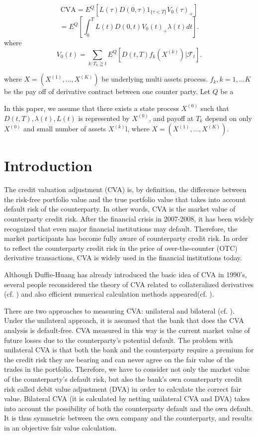 \documentclass[12pt]{article}
\begin{document}
$$\text{CVA}= E^Q[L(\tau)D(0,\tau)1_{\{\tau <T\}}V_0(\tau)_{+}]$$ $$=E^{Q}[\int_0^T L(t)D(0,t) V_0(t)_{+} \lambda(t) dt ]  .$$
where $$V_0(t) = \sum_{k:T_k\geqq t} E^{Q}[D(t,T) f_k(X^{(k)}) |\mathcal{F}_t].$$
 

 where $X=(X^{(1)}, \ldots, X^{(K)})$ be underlying multi assets process. $f_k, k=1,\ldots K$ be the pay off of derivative contract between one counter party. Let $Q$ be a 

 In this paper, we assume that there exists a state process $X^{(0)}$ such that $D(t,T), \lambda(t),
L(t)$ is represented by $X^{(0)}$, and payoff at $T_k$ depend on only $X^{(0)}$ and small number of 
assets $X^{(k)}$l, where $X=(X^{(1)}, \ldots, X^{(K)})$.

\section{Introduction}
The credit valuation adjustment (CVA) is, by definition, the difference
between the risk-free portfolio value and the true portfolio value that takes into account
default risk of the counterparty. In other words, CVA is the market value of counterparty credit risk.
After the financial crisis in 2007-2008, it has been widely recognized that even major financial institutions may default.
Therefore, the market participants has become fully aware of counterparty credit risk.
In order to reflect the counterparty credit risk in the price of over-the-counter (OTC) derivative transactions,
CVA is widely used in the financial institutions today.

Although Duffie-Huang \cite{DU} has already introduced the basic idea of CVA  in 1990's, 
several people reconsidered the theory of CVA related to collateralized derivatives (cf. \cite{FT}) and 
also efficient numerical calculation methods appeared(cf. \cite{H}).

There are two approaches to measuring CVA: unilateral and bilateral (cf. \cite{Gre}). 
Under the unilateral approach, it is assumed that the bank that does
the CVA analysis is default-free.
CVA measured in this way is the current market value of future losses due to the counterparty's potential
default. The problem with unilateral CVA is that both the bank and the counterparty require a
premium for the credit risk they are bearing and can never agree on the fair value of the trades in
the portfolio. Therefore, we have to consider not only the market value of the counterparty's default risk, but also the bank's own counterparty credit risk
called debit value adjustment (DVA) in order to calculate the correct fair value. 
Bilateral CVA (it is calculated by netting unilateral CVA and DVA) takes into account the possibility of both the counterparty default and the own default.
It is thus symmetric between the own company and the counterparty, and results in an
objective fair value calculation.
\end{document}
